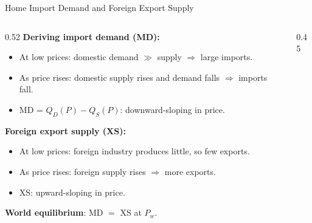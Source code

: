 \documentclass[aspectratio=169]{beamer}
\begin{document}
\begin{frame}{Home Import Demand and Foreign Export Supply}
\begin{columns}
\begin{column}{0.52\textwidth}
\textbf{Deriving import demand (MD):}
\begin{itemize}
  \item At low prices: domestic demand $\gg$ supply $\Rightarrow$ large imports.
  \item As price rises: domestic supply rises and demand falls $\Rightarrow$ imports fall.
  \item MD = $Q_D(P) - Q_S(P)$: downward-sloping in price.
\end{itemize}
\vspace{0.3em}
\textbf{Foreign export supply (XS):}
\begin{itemize}
  \item At low prices: foreign industry produces little, so few exports.
  \item As price rises: foreign supply rises $\Rightarrow$ more exports.
  \item XS: upward-sloping in price.
\end{itemize}
\vspace{0.2em}
\textbf{World equilibrium}: MD $=$ XS at $P_w$.
\end{column}
\begin{column}{0.45\textwidth}
\end{column}
\end{columns}
\end{frame}
\end{document}
